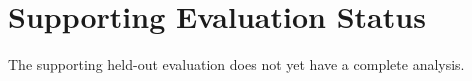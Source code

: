 \section{Supporting Evaluation Status}
The supporting held-out evaluation does not yet have a complete analysis.
